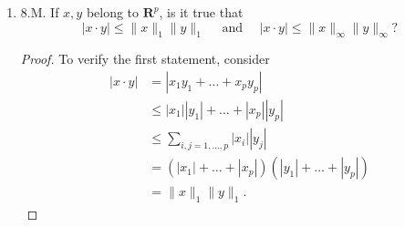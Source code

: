 \begin{enumerate}
\begin{proof}
\begin{itemize}
		If $x = 0$, then for all $i$, $x_i = 0$, hence  $|x_i| = 0$. Therefore $\|x\|_\infty = \operatorname{sup}_i |x_i| = \operatorname{sup}_i 0=  0$.
			Now suppose $\|x\|_\infty = \operatorname{sup}_i |x_i| = 0$. If $x\neq 0$, then there exists some $1<j\le p$ such that $x_j \neq 0$, hence $|x_j| > 0$. Since $0$ is a supremum, we have $0 \ge |x_j| > 0$, a contradiction.
		\item Consider \begin{align*}
				\|ax \|_\infty &= \operatorname{sup} \{|a x_1|, |a x_2|, \ldots, |a x_p|\} \\
		&= \operatorname{sup} \{|a| |x_1|, \ldots, |a| |x_p|\} 
		.\end{align*} 
		If $|a| > 0$, we have $|x_i| \ge  |x_j| \iff |a| |x_i| \ge |a| |x_j|$. Therefore
		\begin{align*}
			\|ax \|_\infty &=  |a| \operatorname{sup} \{ |x_1|, \ldots, |x_p|\} \\
			&= |a| \|x\|
		.\end{align*}
		If $|a| = 0$, then $\|a x\|_{\infty } = \| 0\| = 0 = |0| \|x\| = |a|\|x\|$.
	\item We need to show \[
		\operatorname{sup} \{|x_1+y_1|, \ldots, |x_p+y_p|\}  \le  \operatorname{sup} \{|x_1|,\ldots,|x_p|\} + \operatorname{sup} \{|y_1|,\ldots,|y_p|\}
	.\] 
	We first show that
\[
		\operatorname{sup} \{|x_1+y_1|, \ldots, |x_p+y_p|\}  \le 
		\operatorname{sup} \{|x_1|+|y_1|,\ldots,|x_p|+|y_p|\}
	\]
	which comes from triangle inequality for absolute values. Since $p$ is finite, there exists some $1\le i\le p$ such that $\operatorname{sup} \{|x_1+y_1|, \ldots, |x_p+y_p|\} = |x_i+y_i|$. But $|x_i+y_i| \le  |x_i| + |y_i| \le \operatorname{sup} \{|x_1|+|y_1|,\ldots,|x_p|+|y_p|\}$.

	Next we verify that \[
		\operatorname{sup} \{|x_1|+|y_1|,\ldots,|x_p|+|y_p|\}\le 
\operatorname{sup} \{|x_1|,\ldots,|x_p|\} + \operatorname{sup} \{|y_1|,\ldots,|y_p|\}
.\]
	To demonstrate this, first notice that there exists $1\le i\le p$ such that  $\operatorname{sup} \{|x_1|+|y_1|,\ldots,|x_p|+|y_p|\} = |x_i| + |y_i|$. Now $|x_i| \le \operatorname{sup} \{|x_1|,\ldots,|x_p|\}$ and $|y_i| \le \operatorname{sup} \{|y_1|,\ldots,|y_p|\}$, so the claim follows.
	\end{itemize}
\end{proof}


\item 8.M. If $x, y$ belong to $\boldsymbol{R}^p$, is it true that
\[
|x \cdot y| \leq\|x\|_1\|y\|_1 \quad \text { and } \quad|x \cdot y| \leq\|x\|_{\infty}\|y\|_{\infty} ?
\]
\begin{proof}
	To verify the first statement, consider
	\begin{align*}
		|x \cdot y| &=  \left| x_1y_1 + \ldots+x_py_p \right|  \\
			    &\le |x_1||y_1| + \ldots+|x_p||y_p|\\
			    &\le \sum_{i, j=1,\ldots,p} |x_i| |y_j| \\
			    &= \left( |x_1|+\ldots+|x_p| \right)\left( |y_1|+\ldots+|y_p| \right)  \\
			    &= \|x\|_1 \|y\|_1
	.\end{align*}


\end{proof}
\end{enumerate}
